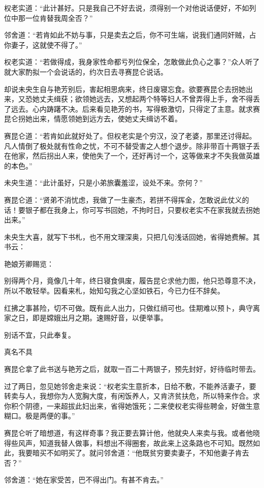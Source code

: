 \documentclass[a4paper,12pt,UTF8,twoside]{ctexbook}
\begin{document}
权老实道：“此计甚好。只是我自己不好去说，须得别一个对他说话便好，不如列位中那一位肯替我周全否？”

邻舍道：“若肯如此不妨与事，只是卖去之后，你不可生端，说我们通同奸贼，占你妻子，这就使不得了。”

权老实道：“若做得成，我身家性命都亏列位保全，怎敢做此负心之事？”众人听了就大家酌拟一个会说话的，约次日去寻赛昆仑说话。

却说未央生自与艳芳别后，害起相思病来，终日废寝忘食。欲要赛昆仑去拐她出来，又恐她丈夫缉获；欲领她远去，又想起两个特等妇人不曾弄得上手，舍不得丢了远去。心内踌躇不决。后来看见艳芳的书，写得极激切，只得定了主意。就求赛昆仑拐她出来，情愿领她到远方去，使她丈夫缉访不着。

赛昆仑道：“若肯如此就好处了。但权老实是个穷汉，没了老婆，那里还讨得起。凡人情倒了极处就有性命之忧，不可不替受害之人想个退步。除非带百十两银子丢在他家，然后拐出人来，使他失了一个，还好再讨一个，这等做来才不失我做英雄的本色。”

未央生道：“此计虽好，只是小弟旅囊羞涩，设处不来。奈何？”

赛昆仑道：“贤弟不消忧虑，我做了一生豪杰，若拼不得挥金，怎敢说此仗义的话！要银子都在我身上，你可写书回她，不拘时日，只要权老实不在家我就去拐她出来。”

未央生大喜，就写下书札，也不用文理深奥，只把几句浅话回她，省得她费解。其书云：

艳娘芳卿赐览：

别得两个月，竟像几十年，终日寝食俱废，履告昆仑求他力图，他只恐尊意不决，所以不敢轻举。因看来札，始知勾我之心坚如铁石，今已力任不辞矣。

红拂之事甚险，切不可做。既有此人出力，只做红绡可也。佳期难以预卜，典守离家之日，即是嫦娥出月之期。速赐好音，以便举事。

别话不宜，只此奉复。

真名不具

赛昆仑拿了此书送与艳芳之后，就取一百二十两银子，预先封好，好待临时带去。

过了两日，忽见她邻舍走来说：“权老实生意折本，日给不敷，不能养活妻子，要转卖与人，我想你为人宽胸大度，有闲饭养人，又肯济贫扶危，所以特来作合。求你积个阴德，一来超拔此妇出来，省得她饿死；二来使权老实得些聘金，好做生意糊口。极是两便的事。”

赛昆仑听了暗想道，有这样奇事？我正要去算计他，他就央人来卖与我。或者他晓得些风声，知道我替人做事，料想出不得圈套，故此来上这条路也不可知。既然如此，我要暗买不如明买了。就问邻舍道：“他既贫穷要卖妻子，不知他妻子肯去否？”

邻舍道：“她在家受苦，巴不得出门。有甚不肯去。”
\end{document}
